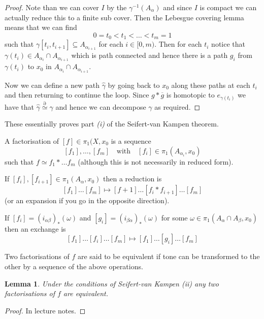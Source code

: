 \documentclass[11pt]{article}
\newcommand{\homrel}{\stackrel{\partial}{\simeq}}
\newenvironment{defin}
	{\begin{mdframed}[backgroundcolor=white, roundcorner=5pt, linewidth=1pt]
		\setlength{\parindent}{0pt}
		}
	{\end{mdframed}}
\newcommand{\mdf}[1]{{\color{red} #1}}
\newtheorem{lemma}[theorem]{Lemma}
\begin{document}
\begin{proof}
Note than we can cover $I$ by the $\gamma^{-1}(A_\alpha)$ and since $I$ is compact we can actually reduce this to a finite sub cover.
Then the Lebesgue covering lemma means that we can find
\[
0=t_0 < t_1 < \dots < t_m = 1
\]
such that $\gamma[t_i, t_{i+1}]\subseteq A_{\alpha_{i+1}}$ for each $i\in[0, m)$.
Then for each $t_i$ notice that $\gamma(t_i)\in A_{\alpha_i}\cap A_{\alpha_{i+1}}$ which is path connected and hence there is a path $g_i$ from $\gamma(t_i)$ to $x_0$ in $A_{\alpha_i}\cap A_{\alpha_{i+1}}$.


Now we can define a new path $\hat{\gamma}$ by going back to $x_0$ along these paths at each $t_i$ and then returning to continue the loop.
Since $g\ast\overline{g}$ is homotopic to $e_{\gamma(t_i)}$ we have that $\hat{\gamma}\homrel\gamma$ and hence we can decompose $\gamma$ as required.
\end{proof}

These essentially proves part \textit{(i)} of the Seifert-van Kampen theorem.

\begin{defin}
	A \mdf{factorisation} of $[f]\in\pi_1(X, x_0$ is a sequence
	\[
		[f_1], \dots, [f_m] \quad \text{with}\quad [f_i]\in\pi_1(A_{\alpha_i}, x_0)
	\]
	such that $f\simeq f_1\ast \dots f_m$ (although this is not necessarily in reduced form).

	If $[f_i], [f_{i+1}]\in\pi_1(A_\alpha, x_0)$ then a \mdf{reduction} is
	\[
		[f_1] \dots [f_m] \mapsto [f+1] \dots [f_i \ast f_{i+1}] \dots [f_m] 
	\]
	(or an \mdf{expansion} if you go in the opposite direction).

	If $[f_i]=(i_{\alpha\beta})_\ast(\omega)$ and $[g_i]=(i_{\beta\alpha})_\ast(\omega)$ for some $\omega\in\pi_1(A_\alpha\cap A_\beta, x_0)$ then an \mdf{exchange} is
	\[
		[f_1]\dots[f_i]\dots[f_m]\mapsto [f_1]\dots[g_i]\dots[f_m]
	\]

	Two factorisations of $f$ are said to be \mdf{equivalent} if tone can be transformed to the other by a sequence of the above operations.
\end{defin}

\begin{lemma}
Under the conditions of Seifert-van Kampen \textit{(ii)} any two factorisations of $f$ are equivalent.
\end{lemma}

\begin{proof}
In lecture notes.
\end{proof}
\end{document}
